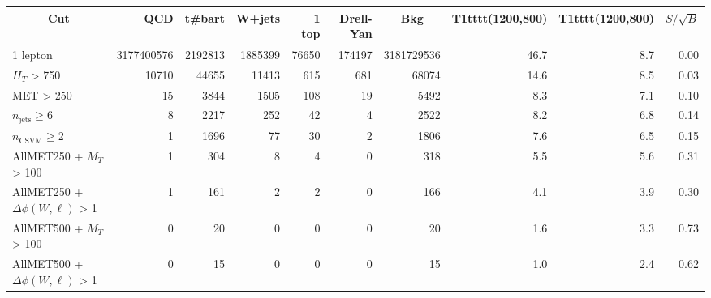 
\begin{tabular}{ l | rrrrr | r | rr | r}\hline\hline
 \multicolumn{1}{c|}{\bf{Cut}}  & \bf{QCD} & \bf{t#bar{t}} & \bf{W+jets} & \bf{1 top} & \bf{Drell-Yan} & \multicolumn{1}{c}{\bf{Bkg}}  & \multicolumn{1}{c}{\bf{T1tttt(1200,800)}}  & \multicolumn{1}{c}{\bf{T1tttt(1200,800)}} & $S/\sqrt{B}$ \\ \hline 
 1 lepton & 3177400576 & 2192813 & 1885399 & 76650 & 174197 & 3181729536 & 46.7 & 8.7 & 0.00 \\ 
$H_{T}$ > 750 & 10710 & 44655 & 11413 & 615 & 681 & 68074 & 14.6 & 8.5 & 0.03 \\ 
MET > 250 & 15 & 3844 & 1505 & 108 & 19 & 5492 & 8.3 & 7.1 & 0.10 \\ 
$n_\text{jets}\geq$6 & 8 & 2217 & 252 & 42 & 4 & 2522 & 8.2 & 6.8 & 0.14 \\ 
$n_\text{CSVM}\geq$2 & 1 & 1696 & 77 & 30 & 2 & 1806 & 7.6 & 6.5 & 0.15 \\ 
\hline 
AllMET250 + $M_{T}$ > 100 & 1 & 304 & 8 & 4 & 0 & 318 & 5.5 & 5.6 & 0.31 \\ 
AllMET250 + $\Delta\phi(W,\ell)$ > 1 & 1 & 161 & 2 & 2 & 0 & 166 & 4.1 & 3.9 & 0.30 \\ 
\hline 
AllMET500 + $M_{T}$ > 100 & 0 & 20 & 0 & 0 & 0 & 20 & 1.6 & 3.3 & 0.73 \\ 
AllMET500 + $\Delta\phi(W,\ell)$ > 1 & 0 & 15 & 0 & 0 & 0 & 15 & 1.0 & 2.4 & 0.62 \\ 
\hline\hline
\end{tabular}

